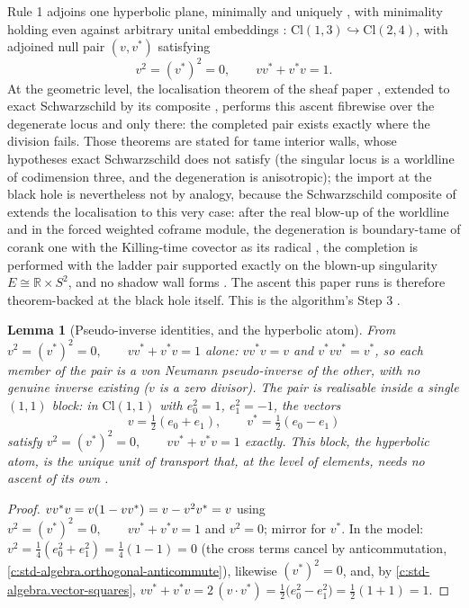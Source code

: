 \documentclass[11pt]{article}
\newtheorem{lemma}[theorem]{Lemma}
\theoremstyle{definition}
\theoremstyle{plain}
\newcommand{\changedmark}[2]{\marginpar{\raggedright\scriptsize\color{#1}#2}}
\providecommand{\Cl}{}\renewcommand{\Cl}{\mathrm{Cl}}
\providecommand{\R}{}\renewcommand{\R}{\mathbb{R}}
\begin{document}
\label{c:note.singularity.setting-step-3-apply-rule}
Rule 1 adjoins one hyperbolic plane, minimally and uniquely \cite[Thms.~4.10, 4.13]{ButlerT1}, with minimality holding even against arbitrary unital embeddings \cite[Thm.~4.19]{ButlerT1}: $\Cl(1,3) \hookrightarrow \Cl(2,4)$, with adjoined null pair $(v, v^*)$ satisfying
\begin{equation}
v^2 = (v^*)^2 = 0, \qquad v v^* + v^* v = 1 . \tag{CAR}
\end{equation}
At the geometric level, the localisation theorem of the sheaf paper \cite[Thm.~4.4, Cor.~4.5]{ButlerT4}, extended to exact Schwarzschild by its composite \cite[Thms 8.7, 8.12]{ButlerT4}, performs this ascent fibrewise over the degenerate locus and only there: the completed pair exists exactly where the division fails. Those theorems are stated for tame interior walls, whose hypotheses exact Schwarzschild does not satisfy (the singular locus is a worldline of codimension three, and the degeneration is anisotropic); the import at the black hole is nevertheless not by analogy, because the Schwarzschild composite of \cite[\S 8]{ButlerT4} extends the localisation to this very case: after the real blow-up of the worldline and in the forced weighted coframe module, the degeneration is boundary-tame of corank one with the Killing-time covector as its radical \cite[Thm.~8.7]{ButlerT4}, the completion is performed with the ladder pair supported exactly on the blown-up singularity $E \cong \R \times S^2$, and no shadow wall forms \cite[Thm.~8.12]{ButlerT4}. The ascent this paper runs is therefore theorem-backed at the black hole itself. This is the algorithm's Step 3 \cite[\S 8.1, Step 3]{ButlerT1}.

\begin{lemma}[Pseudo-inverse identities, and the hyperbolic atom]\label{c:singularity.pseudo-inverse-identities-hyperbolic-atom}
\changedmark{gray}{reworded}
From $v^2 = (v^*)^2 = 0, \qquad v v^* + v^* v = 1$ alone: $v v^* v = v$ and $v^* v v^* = v^*$, so each member of the pair is a von Neumann pseudo-inverse of the other, with no genuine inverse existing ($v$ is a zero divisor). The pair is realisable inside a single $(1,1)$ block: in $\Cl(1,1)$ with $e_0^2 = 1$, $e_1^2 = -1$, the vectors
\[
v = \tfrac12(e_0 + e_1), \qquad v^* = \tfrac12(e_0 - e_1)
\]
satisfy $v^2 = (v^*)^2 = 0, \qquad v v^* + v^* v = 1$ exactly. This block, the \emph{hyperbolic atom}, is the unique unit of transport that, at the level of elements, needs no ascent of its own \cite[Rem.~4.5]{ButlerT1}.
\end{lemma}
\begin{proof}
$v v^* v = v(1 - v v^*)^{\vphantom{*}} = v - v^2 v^* = v$ using $v^2 = (v^*)^2 = 0, \qquad v v^* + v^* v = 1$ and $v^2 = 0$; mirror for $v^*$. In the model: $v^2 = \tfrac14(e_0^2 + e_1^2) = \tfrac14(1 - 1) = 0$ (the cross terms cancel by anticommutation, \ref{c:std-algebra.orthogonal-anticommute}), likewise $(v^*)^2 = 0$, and, by \ref{c:std-algebra.vector-squares}, $v v^* + v^* v = 2\,(v \cdot v^*) = \tfrac12\bigl(e_0^2 - e_1^2\bigr) = \tfrac12(1 + 1) = 1$.

\end{proof}
\end{document}

